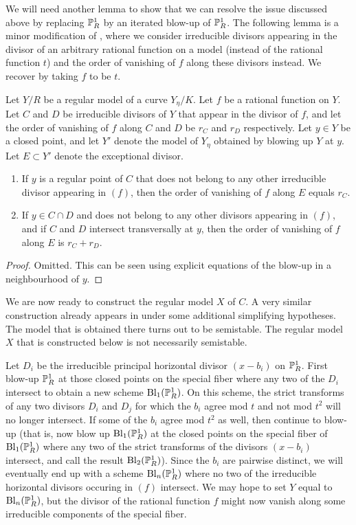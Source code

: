 We will need another lemma to show that we can resolve the issue discussed above by replacing $\P^1_R$ by an iterated blow-up of $\P^1_R$. The following lemma is a minor modification of \cite[Lemma~1.4]{liulor}, where we consider irreducible divisors appearing in the divisor of an arbitrary rational function on a model (instead of the rational function $t$) and the order of vanishing of $f$ along these divisors instead. We recover \cite[Lemma~1.4]{liulor} by taking $f$ to be $t$. 
\begin{lemma}\label{valf}
 Let $Y/R$ be a regular model of a curve $Y_\eta/K$. Let $f$ be a rational function on $Y$. Let $C$ and $D$ be irreducible divisors of $Y$ that appear in the divisor of $f$, and let the order of vanishing of $f$ along $C$ and $D$ be $r_C$ and $r_D$ respectively. Let $y \in Y$ be a closed point, and let $Y'$ denote the model of $Y_\eta$ obtained by blowing up $Y$ at $y$. Let $E \subset Y'$ denote the exceptional divisor.
 \begin{enumerate}
  \item If $y$ is a regular point of $C$ that does not belong to any other irreducible divisor appearing in $(f)$, then the order of vanishing of $f$ along $E$ equals $r_C$.
  \item If $y \in C \cap D$ and does not belong to any other divisors appearing in $(f)$, and if $C$ and $D$ intersect transversally at $y$, then the order of vanishing of $f$ along $E$ is $r_C +r_D$.
 \end{enumerate}
\end{lemma}
\begin{proof}
 Omitted. This can be seen using explicit equations of the blow-up in a neighbourhood of $y$.
\end{proof}

We are now ready to construct the regular model $X$ of $C$. A very similar construction already appears in \cite{kausz} under some additional simplifying hypotheses. The model that is obtained there turns out to be semistable. The regular model $X$ that is constructed below is not necessarily semistable.

Let $D_i$ be the irreducible principal horizontal divisor $(x-b_i )$ on $\P^1_R$. First blow-up $\P^1_R$ at those closed points on the special fiber where any two of the $D_i$ intersect to obtain a new scheme $\mathrm{Bl}_1(\P^1_R)$. On this scheme, the strict transforms of any two divisors $D_i$ and $D_j$ for which the $b_i$ agree mod $t$ and not mod $t^2$ will no longer intersect. If some of the $b_i$ agree mod $t^2$ as well, then continue to blow-up (that is, now blow up $\mathrm{Bl}_1(\P^1_R)$ at the closed points on the special fiber of $\mathrm{Bl}_1(\P^1_R)$ where any two of the strict transforms of the divisors $(x-b_i)$ intersect, and call the result $\mathrm{Bl}_2(\P^1_R)$). Since the $b_i$ are pairwise distinct, we will eventually end up with a scheme $\mathrm{Bl}_n(\P^1_R)$ where no two of the irreducible horizontal divisors occuring in $(f)$ intersect. We may hope to set $Y$ equal to $\mathrm{Bl}_n(\P^1_R)$, but the divisor of the rational function $f$ might now vanish along some irreducible components of the special fiber. 


